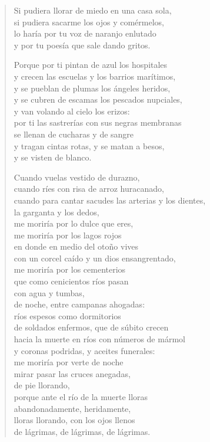 \documentclass[12pt]{article}
\begin{document}
\clearpage
{}
\begin{verse}

Si pudiera llorar de miedo en una casa sola,\\
si pudiera sacarme los ojos y comérmelos,\\
lo haría por tu voz de naranjo enlutado\\
y por tu poesía que sale dando gritos.  

Porque por ti pintan de azul los hospitales\\
y crecen las escuelas y los barrios marítimos,\\
y se pueblan de plumas los ángeles heridos,\\
y se cubren de escamas los pescados nupciales,\\
y van volando al cielo los erizos:\\
por ti las sastrerías con sus negras membranas\\
se llenan de cucharas y de sangre\\
y tragan cintas rotas, y se matan a besos,\\
y se visten de blanco.  

Cuando vuelas vestido de durazno,\\
cuando ríes con risa de arroz huracanado,\\
cuando para cantar sacudes las arterias y los dientes,\\
la garganta y los dedos,\\
me moriría por lo dulce que eres,\\
me moriría por los lagos rojos\\
en donde en medio del otoño vives\\
con un corcel caído y un dios ensangrentado,\\
me moriría por los cementerios\\
que como cenicientos ríos pasan\\
con agua y tumbas,\\
de noche, entre campanas ahogadas:\\
ríos espesos como dormitorios\\
de soldados enfermos, que de súbito crecen\\
hacia la muerte en ríos con números de mármol\\
y coronas podridas, y aceites funerales:\\
me moriría por verte de noche\\
mirar pasar las cruces anegadas,\\
de pie llorando,\\
porque ante el río de la muerte lloras\\
abandonadamente, heridamente,\\
lloras llorando, con los ojos llenos\\
de lágrimas, de lágrimas, de lágrimas.  


\end{verse}
\end{document}
